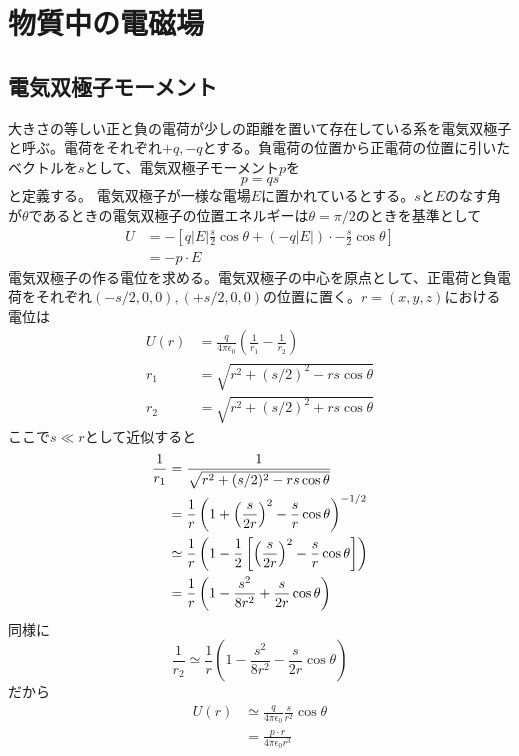 \section{物質中の電磁場}

\subsection{電気双極子モーメント}
    大きさの等しい正と負の電荷が少しの距離を置いて存在している系を電気双極子と呼ぶ。電荷をそれぞれ$+q, -q$とする。負電荷の位置から正電荷の位置に引いたベクトルを$s$として、電気双極子モーメント$p$を
        \[p = qs\]
    と定義する。
    電気双極子が一様な電場$E$に置かれているとする。$s$と$E$のなす角が$\theta$であるときの電気双極子の位置エネルギーは$\theta = \pi / 2$のときを基準として
    \begin{align*}
        U   &= -\left[q|E|\frac{s}{2}\cos\theta + (-q|E|) \cdot -\frac{s}{2}\cos\theta\right]\\
            &= -p \cdot E
    \end{align*}
    電気双極子の作る電位を求める。電気双極子の中心を原点として、正電荷と負電荷をそれぞれ$(-s/2, 0, 0), (+s/2, 0, 0)$の位置に置く。$r = (x, y, z)$における電位は
    \begin{align*}
        U(r) &= \frac{q}{4\pi\epsilon_0}\left(\frac{1}{r_1} - \frac{1}{r_2}\right)\\
        r_1 &= \sqrt{r^2 + (s/2)^2 - rs\cos\theta}\\
        r_2 &= \sqrt{r^2 + (s/2)^2 + rs\cos\theta}
    \end{align*}
    ここで$s \ll r$として近似すると
    \begin{align*}
        \frac{1}{r_1}
            &= \frac{1}{\sqrt{r^2 + (s/2)^2 - rs\cos\theta}}\\
            &= \frac{1}{r}\left(1 + \left(\frac{s}{2r}\right)^2 - \frac{s}{r}\cos\theta\right)^{-1/2}\\
            &\simeq \frac{1}{r}\left(1 - \frac{1}{2}\left[\left(\frac{s}{2r}\right)^2 - \frac{s}{r}\cos\theta \right]\right)\\
            &= \frac{1}{r}\left(1 - \frac{s^2}{8r^2} + \frac{s}{2r}\cos\theta\right)
    \end{align*}
    同様に
        \[\frac{1}{r_2} \simeq \frac{1}{r}\left(1 - \frac{s^2}{8r^2} - \frac{s}{2r}\cos\theta\right)\]
    だから
    \begin{align*}
        U(r)
            &\simeq \frac{q}{4\pi\epsilon_0}\frac{s}{r^2}\cos\theta\\
            &= \frac{p \cdot r}{4\pi\epsilon_0r^3}
    \end{align*}
